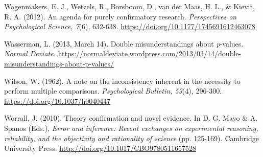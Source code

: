 \documentclass[authordate, meta]{jote-new-article}
\begin{document}
	Wagenmakers, E. J., Wetzels, R., Borsboom, D., van der Maas, H. L., \& Kievit, R. A. (2012). An agenda for purely confirmatory research. \emph{Perspectives on Psychological Science, 7}(6), 632-638. \url{https://doi.org/10.1177/1745691612463078}



	Wasserman, L. (2013, March 14). Double misunderstandings about \emph{p}-values. \emph{Normal Deviate.} \url{https://normaldeviate.wordpress.com/2013/03/14/double-misunderstandings-about-p-values/}



	Wilson, W. (1962). A note on the inconsistency inherent in the necessity to perform multiple comparisons. \emph{Psychological Bulletin, 59}(4)\emph{,} 296-300. \url{https://doi.org/10.1037/h0040447}



	Worrall, J. (2010). Theory conﬁrmation and novel evidence. In D. G. Mayo \& A. Spanos (Eds.), \emph{Error and inference: Recent exchanges on experimental reasoning, reliability, and the objectivity and rationality of science }(pp. 125-169)\emph{.} Cambridge University Press. \url{http://doi.org/10.1017/CBO9780511657528}
\end{document}
